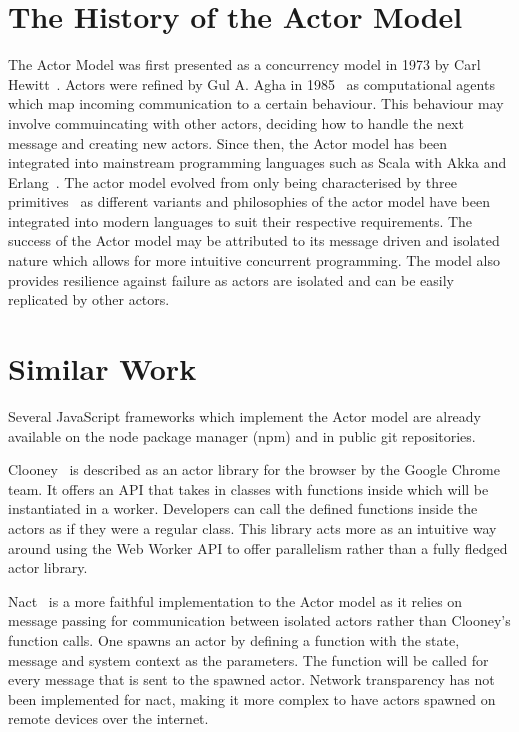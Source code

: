 \documentclass[12pt, a4paper]{report}
\theoremstyle{definition}
\theoremstyle{definition}%
\theoremstyle{definition}%
\theoremstyle{definition}%
\theoremstyle{definition}%
\theoremstyle{definition}%
\begin{document}
\section{The History of the Actor Model}
The Actor Model was first presented as a concurrency model in 1973 by Carl Hewitt~\cite{hewitt1973session}. Actors were refined by Gul A. Agha in 1985~\cite{agha1985actors} as computational agents which map incoming communication to a certain behaviour. This behaviour may involve commuincating with other actors, deciding how to handle the next message and creating new actors. Since then, the Actor model has been integrated into mainstream programming languages such as Scala with Akka and Erlang~\cite{43years}\cite{haller2012integration}. The actor model evolved from only being characterised by three primitives~\cite{agha1985actors} as different variants and philosophies of the actor model have been integrated into modern languages to suit their respective requirements. The success of the Actor model may be attributed to its message driven and isolated nature which allows for more intuitive concurrent programming. The model also provides resilience against failure as actors are isolated and can be easily replicated by other actors\cite{reactivemanifesto}.
\section{Similar Work}
Several JavaScript frameworks which implement the Actor model are already available on the node package manager (npm) and in public git repositories.

Clooney~\cite{clooney} is described as an actor library for the browser by the Google Chrome team. It offers an API that takes in classes with functions inside which will be instantiated in a worker. Developers can call the defined functions inside the actors as if they were a regular class. This library acts more as an intuitive way around using the Web Worker API to offer parallelism rather than a fully fledged actor library. 

Nact~\cite{nact} is a more faithful implementation to the Actor model as it relies on message passing for communication between isolated actors rather than Clooney's function calls. One spawns an actor by defining a function with the state, message and system context as the parameters. The function will be called for every message that is sent to the spawned actor. Network transparency has not been implemented for nact, making it more complex to have actors spawned on remote devices over the internet.
\end{document}
